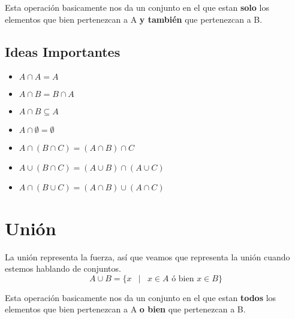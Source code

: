 \documentclass[12pt, fleqn]{report}                             %
\DeclareMathOperator \Space     {\quad}                         %
\DeclareMathOperator \MiniSpace {\;}                            %
\newcommand \Such           {\MiniSpace | \MiniSpace}           %
\theoremstyle{break}                                            %
\begin{document}
            Esta operación basicamente nos da un conjunto en el que estan \textbf{solo} los elementos
            que bien pertenezcan a A \textbf{y también} que pertenezcan a B.

            \subsection{Ideas Importantes}

                \begin{itemize}
                    \item $A \cap A = A$

                    \item $A \cap B = B \cap A$

                    \item $A \cap B \subseteq A$

                    \item $A \cap \emptyset = \emptyset$

                    \item $A \cap (B \cap C) = (A \cap B) \cap C$

                    \item $A \cup (B \cap C) = (A \cup B) \cap (A \cup C)$

                    \item $A \cap (B \cup C) = (A \cap B) \cup (A \cap C)$
                \end{itemize}


        \clearpage
        \section{Unión}

            La unión representa la fuerza, así que veamos que representa la unión cuando estemos
            hablando de conjuntos.
            \begin{equation*}
                A \cup B = \{ x \Such x \in A \text{ ó bien } x \in B \}
            \end{equation*}

            Esta operación basicamente nos da un conjunto en el que estan \textbf{todos} los elementos
            que bien pertenezcan a A \textbf{o bien} que pertenezcan a B.
\end{document}

